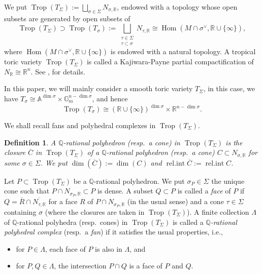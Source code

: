 \documentclass[12pt,a4]{amsart}
\newtheorem{dfn}[thm]{Definition}
\def\A{\mathbb{A}}
\def\G{\mathbb{G}}
\def\R{\mathbb{R}}
\def\Q{\mathbb{Q}}
\def\Trop{\mathop{\mathrm{trop}}\nolimits}
\def\relint{\mathop{\mathrm{rel.int}}\nolimits}
\def\Hom{\mathop{\mathrm{Hom}}\nolimits}
\def\Trop{\mathop{\mathrm{Trop}}\nolimits}
\numberwithin{equation}{section}
\numberwithin{figure}{section}
\begin{document}
  We put $\Trop(T_{\Sigma}):=\bigsqcup_{\sigma\in\Sigma}N_{\sigma,\R}$,  endowed with a topology whose open subsets are 
  generated by 
  open subsets of 
  $$\Trop(T_{\Sigma}) \supset 
    \Trop(T_{\sigma}):=
   \bigsqcup_{\substack{\tau\in\Sigma\\
   \tau\subset\sigma } }N_{\tau,\R}
    \cong
   \Hom(M\cap\sigma^{\vee},\R\cup\{\infty\}),
  $$
  where 
  $ \Hom(M\cap\sigma^{\vee},\R\cup\{\infty\})$ is endowed with a natural topology.
  A tropical toric variety $\Trop(T_{\Sigma})$ is called a Kajiwara-Payne partial compactification of $N_{\R}\cong\R^{n}$. 
  See \cite{PayneAnalytificationisthelimitofalltropicalizations2009},
  \cite{RabinoffTropicalanalyticgeometryNewtonpolygonsandtropicalintersections2012} for details.

  In this paper, we will mainly consider a smooth toric variety $T_{\Sigma}$, 
  in this case,  we have $T_{\sigma}\cong\A^{\dim\sigma}\times\G_{m}^{n-\dim\sigma}$,
  and 
  hence 
  \[
  \Trop(T_{\sigma})\cong(\R\cup\{\infty\})^{\dim\sigma}\times\R^{n-\dim\sigma}.
  \]
  
    We shall recall fans and polyhedral complexes in $\Trop (T_{\Sigma})$.
  
  
  \begin{dfn}
  A  \emph{$\Q$-rational polyhedron} 
  (resp.\ a \emph{cone}) 
  in $\Trop(T_{\Sigma})$ is the closure $\overline{C}$
  in $\Trop(T_{\Sigma})$ of a $\Q$-rational polyhedron (resp.\ a cone) $C\subset N_{\sigma,\R}$
  for some $\sigma\in\Sigma$. We put $\dim(\overline{C}):=\dim(C)$ and 
  $\relint\overline{C}:=\relint C$. 
  \end{dfn}
  
  Let $P\subset \Trop(T_{\Sigma})$ be a $\Q$-rational polyhedron. 
  We put $\sigma_{P}\in\Sigma$
  the unique cone 
  such that $P\cap N_{\sigma_{P},\R}\subset P$ is dense.
  A subset $Q \subset P$ is called 
  a \emph{face} of $P$ 
  if  $ Q = \overline{R} \cap \overline{N_{\tau,\R}}$
  for a face $R$ of $P \cap N_{\sigma_P, \R}$ (in the usual sense) and a cone $\tau \in \Sigma$ containing $\sigma$
  (where the closures are taken in $\Trop (T_{\Sigma})$).
  A finite collection $\Lambda$ of  $\Q$-rational polyhedra (resp.\ cones) in $\Trop(T_{\Sigma})$
   is called  a   \emph{$\Q$-rational polyhedral complex} (resp.\ a \emph{fan}) 
   if it satisfies the usual properties, i.e., 
  \begin{itemize}
  \item for $P \in \Lambda$, each face of $P$ is also in $\Lambda$, and 
  \item for $P,Q \in \Lambda$, the intersection $P \cap Q$ is a face of $P$ and $Q$.
  \end {itemize}
\end{document}
